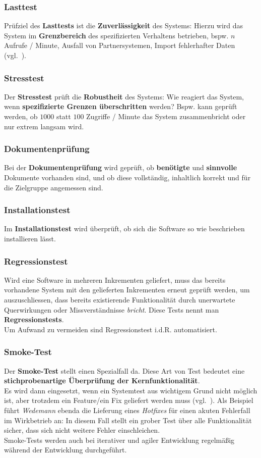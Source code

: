 \subsubsection*{Lasttest}
Prüfziel des \textbf{Lasttests} ist die \textbf{Zuverlässigkeit} des Systems: Hierzu wird das System im \textbf{Grenzbereich} des spezifizierten Verhaltens betrieben, bspw. $n$ Aufrufe / Minute, Ausfall von Partnersystemen, Import fehlerhafter Daten (vgl.~\cite[63]{Wed09c}).

\subsubsection*{Stresstest}
Der \textbf{Stresstest} prüft die \textbf{Robustheit} des Systems: Wie reagiert das System, wenn \textbf{spezifizierte Grenzen überschritten} werden? Bspw. kann geprüft werden, ob $1000$ statt $100$ Zugriffe / Minute das System zusammenbricht oder nur extrem langsam wird.

\subsubsection*{Dokumentenprüfung}
Bei der \textbf{Dokumentenprüfung} wird geprüft, ob \textbf{benötigte} und \textbf{sinnvolle} Dokumente vorhanden sind, und ob diese vollständig, inhaltlich korrekt und für die Zielgruppe angemessen sind.

\subsubsection*{Installationstest}
Im \textbf{Installationstest} wird überprüft, ob sich die Software so wie beschrieben installieren lässt.

\subsubsection*{Regressionstest}
Wird eine Software in mehreren Inkrementen geliefert, muss das bereits vorhandene System mit den gelieferten Inkrementen erneut geprüft werden, um auszuschliessen, dass bereits existierende Funktionalität durch unerwartete Querwirkungen oder Missverständnisse \textit{bricht}.
Diese Tests nennt man \textbf{Regressionstests}.\\
Um Aufwand zu vermeiden sind Regressionstest i.d.R. automatisiert.

\subsubsection*{Smoke-Test}
Der \textbf{Smoke-Test} stellt einen Spezialfall da.
Diese Art von Test bedeutet eine \textbf{stichprobenartige Überprüfung der Kernfunktionalität}.\\
Es wird dann eingesetzt, wenn ein Systemtest aus wichtigem Grund nicht möglich ist, aber trotzdem ein Feature/ein Fix geliefert werden muss (vgl.~\cite[64]{Wed09c}).
Als Beispiel führt \textit{Wedemann} ebenda die Lieferung eines \textit{Hotfixes} für einen akuten Fehlerfall im Wirkbetrieb an: In diesem Fall stellt ein grober Test über alle Funktionalität sicher, dass sich nicht weitere Fehler einschleichen.\\
Smoke-Tests werden auch bei iterativer und agiler Entwicklung regelmäßig während der Entwicklung durchgeführt.